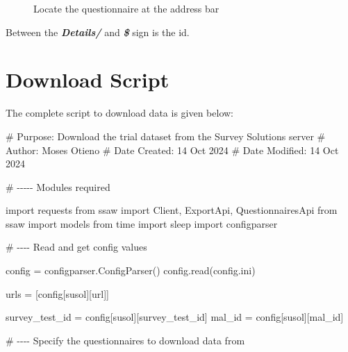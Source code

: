 \documentclass[
  letterpaper,
  DIV=11,
  numbers=noendperiod]{scrreprt}
\newenvironment{Shaded}{\begin{snugshade}}{\end{snugshade}}
\newcommand{\CommentTok}[1]{\textcolor[rgb]{0.37,0.37,0.37}{#1}}
\newcommand{\ImportTok}[1]{\textcolor[rgb]{0.00,0.46,0.62}{#1}}
\newcommand{\NormalTok}[1]{\textcolor[rgb]{0.00,0.23,0.31}{#1}}
\newcommand{\OperatorTok}[1]{\textcolor[rgb]{0.37,0.37,0.37}{#1}}
\newcommand{\StringTok}[1]{\textcolor[rgb]{0.13,0.47,0.30}{#1}}
\begin{document}
\begin{enumerate}
\begin{figure}[H]
{  }

  \caption{Locate the questionnaire at the address bar}

  \end{figure}%
\end{enumerate}

Between the \textbf{\emph{Details/}} and \textbf{\emph{\$}} sign is the
id.

\section{Download Script}\label{download-script}

The complete script to download data is given below:

\begin{Shaded}
\begin{Highlighting}[]
\CommentTok{\# Purpose: Download the trial dataset from the Survey Solutions server}
\CommentTok{\# Author: Moses Otieno}
\CommentTok{\# Date Created: 14 Oct 2024}
\CommentTok{\# Date Modified: 14 Oct 2024}

\CommentTok{\# {-}{-}{-}{-}{-} Modules required}

\ImportTok{import}\NormalTok{ requests}
\ImportTok{from}\NormalTok{ ssaw }\ImportTok{import}\NormalTok{ Client, ExportApi, QuestionnairesApi}
\ImportTok{from}\NormalTok{ ssaw }\ImportTok{import}\NormalTok{ models}
\ImportTok{from}\NormalTok{ time }\ImportTok{import}\NormalTok{ sleep}
\ImportTok{import}\NormalTok{ configparser}


\CommentTok{\# {-}{-}{-}{-} Read and get config values }

\NormalTok{config }\OperatorTok{=}\NormalTok{ configparser.ConfigParser()}
\NormalTok{config.read(}\StringTok{\textquotesingle{}config.ini\textquotesingle{}}\NormalTok{)}

\NormalTok{urls }\OperatorTok{=}\NormalTok{ [config[}\StringTok{\textquotesingle{}susol\textquotesingle{}}\NormalTok{][}\StringTok{\textquotesingle{}url\textquotesingle{}}\NormalTok{]]}

\NormalTok{survey\_test\_id }\OperatorTok{=}\NormalTok{ config[}\StringTok{\textquotesingle{}susol\textquotesingle{}}\NormalTok{][}\StringTok{\textquotesingle{}survey\_test\_id\textquotesingle{}}\NormalTok{]}
\NormalTok{mal\_id }\OperatorTok{=}\NormalTok{ config[}\StringTok{\textquotesingle{}susol\textquotesingle{}}\NormalTok{][}\StringTok{\textquotesingle{}mal\_id\textquotesingle{}}\NormalTok{]}

\CommentTok{\# {-}{-}{-}{-} Specify the questionnaires to download data from }


\end{Highlighting}
\end{Shaded}
\end{document}

